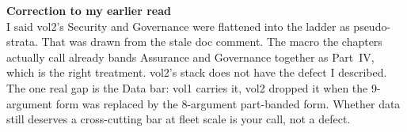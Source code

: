 \documentclass[10pt]{article}
\begin{document}
\begin{minipage}[t]{5.2cm}\raggedright
\textbf{\footnotesize Correction to my earlier read}\\[2pt]
{\fontsize{7}{9}\selectfont
I said vol2's Security and Governance were flattened into the ladder as pseudo-strata.
That was drawn from the stale doc comment. The macro the chapters actually call already
bands Assurance and Governance together as Part~IV, which is the right treatment. vol2's
stack does not have the defect I described.\\[4pt]
The one real gap is the Data bar: vol1 carries it, vol2 dropped it when the 9-argument
form was replaced by the 8-argument part-banded form. Whether data still deserves a
cross-cutting bar at fleet scale is your call, not a defect.}
\end{minipage}
\end{document}
